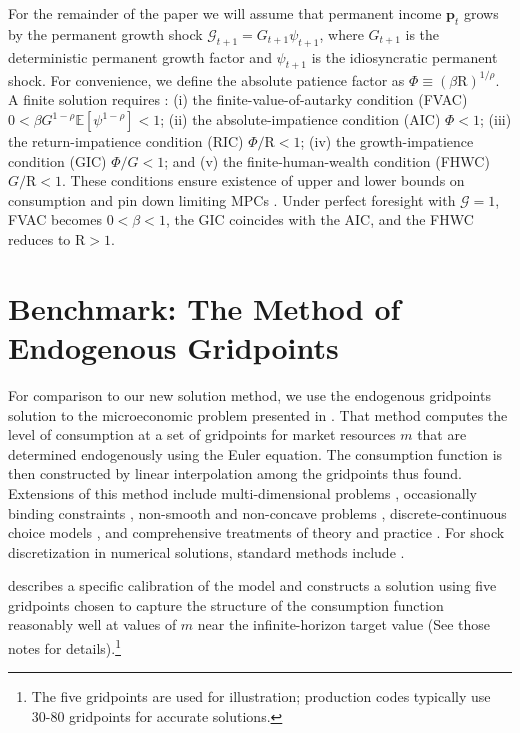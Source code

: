 \documentclass[twocolumn, switch]{article}
\newcommand{\CRRA}{\rho}
\newcommand{\Ex}{\mathbf{\mathbb{E}}}
\newcommand{\DiscFac}{\beta}
\newcommand{\Rfree}{\text{R}}
\newcommand{\PermGroShk}{\mathcal{G}}
\newcommand{\pLvl}{\mathbf{p}}
\newcommand{\PermGroFac}{G}
\newcommand{\permShk}{\psi}
\newcommand{\mNrm}{m}
\newcommand{\AbsPatFac}{\Phi}
\begin{document}
For the remainder of the paper we will assume that permanent income $\pLvl_{t}$
grows by the permanent growth shock $\PermGroShk_{t+1} = \PermGroFac_{t+1} \permShk_{t+1}$, where
$\PermGroFac_{t+1}$ is the deterministic permanent growth factor and $\permShk_{t+1}$ is the idiosyncratic permanent shock. For convenience, we define the absolute patience factor as
$\AbsPatFac\equiv(\DiscFac\Rfree)^{1/\CRRA}$. A finite solution requires \citep{CarrollShanker2024}: (i)
the finite-value-of-autarky condition (FVAC)
$0<\DiscFac\PermGroFac^{1 -\CRRA}\Ex[\permShk^{1 -\CRRA}]<1$; (ii) the absolute-impatience condition
(AIC) $\AbsPatFac<1$; (iii) the return-impatience condition (RIC)
$\AbsPatFac/\Rfree<1$; (iv) the growth-impatience condition (GIC)
$\AbsPatFac/\PermGroFac<1$; and (v) the finite-human-wealth condition (FHWC)
$\PermGroFac/\Rfree<1$. These conditions ensure existence of upper and lower bounds on consumption \citep{Carroll2001MPCBound, StachurskiToda2019JET} and pin down limiting MPCs \citep{MaToda2021SavingRateRich}. Under perfect foresight with $\PermGroShk=1$, FVAC becomes $0<\DiscFac<1$,
the GIC coincides with the AIC, and the FHWC reduces to $\Rfree>1$.

\section{Benchmark: The Method of Endogenous Gridpoints}

For comparison to our new solution method, we use the endogenous gridpoints
solution to the microeconomic problem presented in \citet{carrollEGM}. That
method computes the level of consumption at a set of gridpoints for market
resources $\mNrm$ that are determined endogenously using the Euler equation. The
consumption function is then constructed by linear interpolation among the
gridpoints thus found. Extensions of this method include multi-dimensional problems \citep{BarillasFV2007}, occasionally binding constraints \citep{HintermaierKoeniger2010}, non-smooth and non-concave problems \citep{Fella2014}, discrete-continuous choice models \citep{IskhakovRustSchjerning2017}, and comprehensive treatments of theory and practice \citep{White2015}. For shock discretization in numerical solutions, standard methods include \citep{TauchenHussey1991, tauchen1986}.

\citet{SolvingMicroDSOPs} describes a specific calibration of the model and
constructs a solution using five gridpoints chosen to capture the structure of
the consumption function reasonably well at values of $\mNrm$ near the
infinite-horizon target value (See those notes for details).\footnote{The five gridpoints are used for illustration; production codes typically
use 30-80 gridpoints for accurate solutions.}
\end{document}
